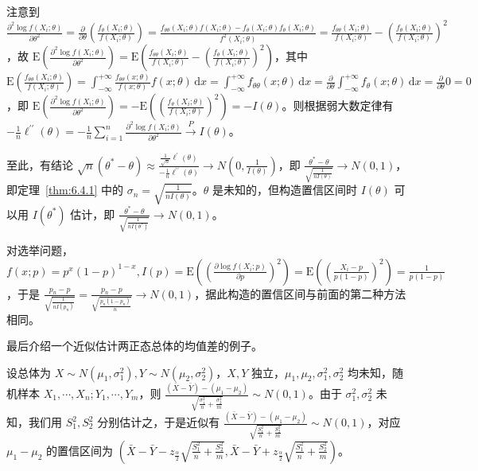 \documentclass[../main.tex]{subfiles}
\begin{document}
注意到 $\frac{\partial^2\log f(X_i;\theta)}{\partial\theta^2}=\frac\partial{\partial\theta}\left(\frac{f_\theta(X_i;\theta)}{f(X_i;\theta)}\right)=\frac{f_{\theta\theta}(X_i;\theta)f(X_i;\theta)-f_\theta(X_i;\theta)f_\theta(X_i;\theta)}{f^2(X_i;\theta)}=\frac{f_{\theta\theta}(X_i;\theta)}{f(X_i;\theta)}-\left(\frac{f_\theta(X_i;\theta)}{f(X_i;\theta)}\right)^2$，故 $\mathrm E\left(\frac{\partial^2\log f(X_i;\theta)}{\partial\theta^2}\right)=\mathrm E\left(\frac{f_{\theta\theta}(X_i;\theta)}{f(X_i;\theta)}-\left(\frac{f_\theta(X_i;\theta)}{f(X_i;\theta)}\right)^2\right)$，其中 $\mathrm E(\frac{f_{\theta\theta}(X_i;\theta)}{f(X_i;\theta)})=\int_{-\infty}^{+\infty}\frac{f_{\theta\theta}(x;\theta)}{f(x;\theta)}f(x;\theta)\,\mathrm dx=\int_{-\infty}^{+\infty}f_{\theta\theta}(x;\theta)\,\mathrm dx=\frac{\partial}{\partial\theta}\int_{-\infty}^{+\infty}f_\theta(x;\theta)\,\mathrm dx=\frac{\partial}{\partial\theta}0=0$，即 $\mathrm E\left(\frac{\partial^2\log f(X_i;\theta)}{\partial\theta^2}\right)=-\mathrm E\left(\left(\frac{f_\theta(X_i;\theta)}{f(X_i;\theta)}\right)^2\right)=-I(\theta)$。则根据弱大数定律有 $-\frac1n\ell^{\prime\prime}(\theta)=-\frac1n\sum_{i=1}^n\frac{\partial^2\log f(X_i;\theta)}{\partial\theta^2}\overset{P}{\rightarrow}I(\theta)$。

至此，有结论 $\sqrt n(\theta^*-\theta)\approx\frac{\frac1{\sqrt n}\ell^\prime(\theta)}{-\frac1n\ell^{\prime\prime}(\theta)}\rightarrow N(0,\frac1{I(\theta)})$，即 $\frac{\theta^*-\theta}{\sqrt{\frac1{nI(\theta)}}}\rightarrow N(0,1)$，即定理~\ref{thm:6.4.1} 中的 $\sigma_n=\sqrt{\frac1{nI(\theta)}}$。$\theta$ 是未知的，但构造置信区间时 $I(\theta)$ 可以用 $I(\theta^*)$ 估计，即 $\frac{\theta^*-\theta}{\sqrt{\frac1{nI(\theta^*)}}}\rightarrow N(0,1)$。

对选举问题，$f(x;p)=p^x(1-p)^{1-x},I(p)=\mathrm E\left(\left(\frac{\partial\log f(X_i;p)}{\partial p}\right)^2\right)=\mathrm E\left(\left(\frac{X_i-p}{p(1-p)}\right)^2\right)=\frac1{p(1-p)}$，于是 $\frac{p_n-p}{\sqrt{\frac1{nI(p_n)}}}=\frac{p_n-p}{\sqrt{\frac{p_n(1-p_n)}n}}\rightarrow N(0,1)$，据此构造的置信区间与前面的第二种方法相同。

最后介绍一个近似估计两正态总体的均值差的例子。

\begin{example}
    设总体为 $X\sim N(\mu_1,\sigma_1^2),Y\sim N(\mu_2,\sigma_2^2)$，$X,Y$ 独立，$\mu_1,\mu_2,\sigma_1^2,\sigma_2^2$ 均未知，随机样本 $X_1,\cdots,X_n;Y_1,\cdots,Y_m$，则 $\frac{(\bar X-\bar Y)-(\mu_1-\mu_2)}{\sqrt{\frac{\sigma_1^2}n+\frac{\sigma_2^2}m}}\sim N(0,1)$。由于 $\sigma_1^2,\sigma_2^2$ 未知，我们用 $S_1^2,S_2^2$ 分别估计之，于是近似有 $\frac{(\bar X-\bar Y)-(\mu_1-\mu_2)}{\sqrt{\frac{S_1^2}n+\frac{S_2^2}m}}\sim N(0,1)$，对应 $\mu_1-\mu_2$ 的置信区间为 $(\bar X-\bar Y-z_{\frac\alpha2}\sqrt{\frac{S_1^2}n+\frac{S_2^2}m},\bar X-\bar Y+z_{\frac\alpha2}\sqrt{\frac{S_1^2}n+\frac{S_2^2}m})$。
\end{example}
\end{document}
